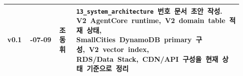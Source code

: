 \documentclass[12pt,a4paper]{article}
\begin{document}
\begin{small}
\begin{longtable}{@{}>{\centering\arraybackslash}m{0.100\linewidth}>{\centering\arraybackslash}m{0.145\linewidth}>{\centering\arraybackslash}m{0.080\linewidth}>{\RaggedRight\arraybackslash}m{0.622\linewidth}@{}}
v0.1 & 2026-\allowbreak{}07-\allowbreak{}09 & 조동휘 & \shortstack[l]{\mbox{\texttt{13\_system\_architecture} 번호 문서 초안 작성.}\\\mbox{V2 AgentCore runtime, V2 domain table 적재 상태,}\\\mbox{SmallCities DynamoDB primary 구성, V2 vector index,}\\\mbox{RDS/Data Stack, CDN/API 구성을 현재 상태 기준으로 정리}} \\
\bottomrule
\end{longtable}
\end{small}
\end{document}
